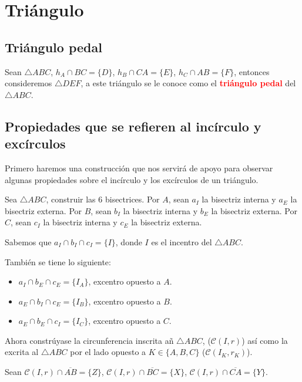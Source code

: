 \chapter{Triángulo}

\section{Triángulo pedal}
\begin{df}
Sean $\triangle ABC$, $h_{A}\cap BC=\{D\}$, $h_{B}\cap CA=\{E\}$, $h_{C}\cap AB=\{F\}$, entonces consideremos $\triangle DEF$, a este triángulo se le conoce como el \textcolor{red}{\bf triángulo pedal} del $\triangle ABC$.
\end{df}
\section{Propiedades que se refieren al incírculo y excírculos}
Primero haremos una construcción que nos servirá de apoyo para observar algunas propiedades sobre el incírculo y los excírculos de un triángulo. 

Sea $\triangle ABC$, construir las 6 bisectrices. Por $A$, sean $a_{I}$ la bisectriz interna y $a_{E}$ la bisectriz externa. 
Por $B$, sean $b_{I}$ la bisectriz interna y $b_{E}$ la bisectriz externa. 
Por $C$, sean $c_{I}$ la bisectriz interna y $c_{E}$ la bisectriz externa. 

Sabemos que $a_{I}\cap b_{I}\cap c_{I}=\{I\}$, donde $I$ es el incentro del $\triangle ABC$. 

También se tiene lo siguiente:
\begin{itemize}
\item $a_{I}\cap b_{E}\cap c_{E}=\{I_{A}\}$, excentro opuesto a $A$.
\item $a_{E}\cap b_{I}\cap c_{E}=\{I_{B}\}$, excentro opuesto a $B$.
\item $a_{E}\cap b_{E}\cap c_{I}=\{I_{C}\}$, excentro opuesto a $C$.
\end{itemize}

Ahora constrúyase la circunferencia inscrita añ $\triangle ABC$, ($\mathcal{C}(I,r)$) así como la excrita al $\triangle ABC$ por el lado opuesto a $K\in\{A,B,C\}$ ($\mathcal{C}(I_{K},r_{K})$).

Sean $\mathcal{C}(I,r)\cap\overline{AB}=\{Z\}$, $\mathcal{C}(I,r)\cap\overline{BC}=\{X\}$, $\mathcal{C}(I,r)\cap\overline{CA}=\{Y\}$.
 
